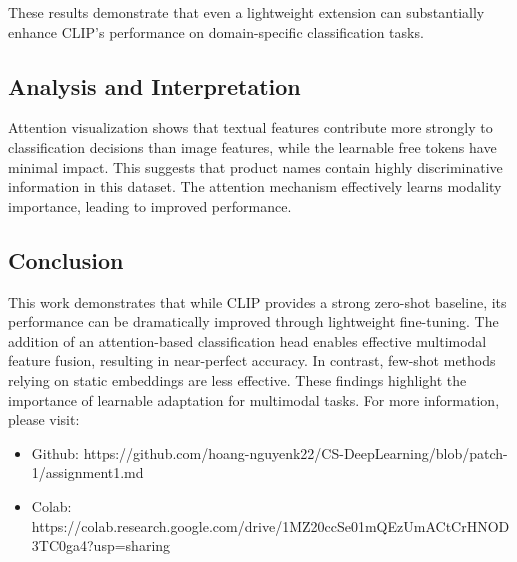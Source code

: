 These results demonstrate that even a lightweight extension can substantially enhance CLIP's performance on domain-specific classification tasks.

\subsection{Analysis and Interpretation}
Attention visualization shows that textual features contribute more strongly to classification decisions than image features, while the learnable free tokens have minimal impact. This suggests that product names contain highly discriminative information in this dataset. The attention mechanism effectively learns modality importance, leading to improved performance.

\subsection{Conclusion}
This work demonstrates that while CLIP provides a strong zero-shot baseline, its performance can be dramatically improved through lightweight fine-tuning. The addition of an attention-based classification head enables effective multimodal feature fusion, resulting in near-perfect accuracy. In contrast, few-shot methods relying on static embeddings are less effective. These findings highlight the importance of learnable adaptation for multimodal tasks. For more information, please visit:
\begin{itemize}
    \item Github: https://github.com/hoang-nguyenk22/CS-DeepLearning/blob/patch-1/assignment1.md
    \item Colab: https://colab.research.google.com/drive/1MZ20ccSe01mQEzUmACtCrHNOD3TC0ga4?usp=sharing
\end{itemize}
